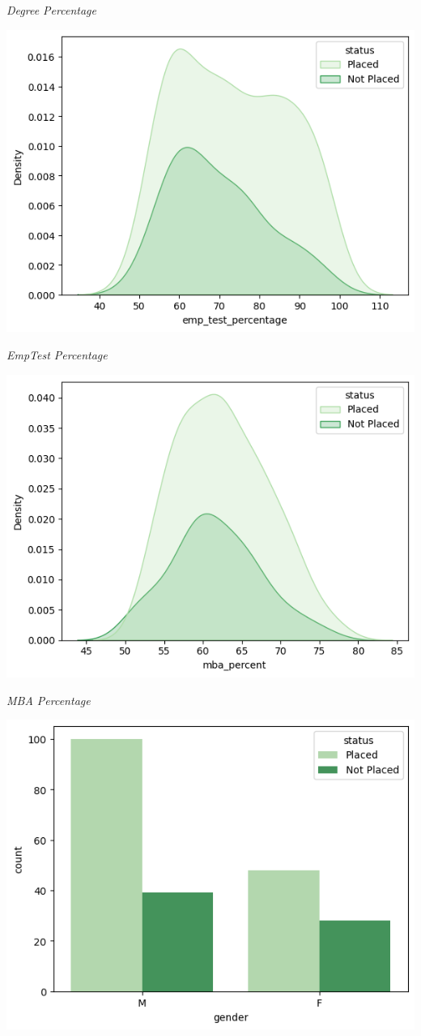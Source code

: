 \documentclass{article}
\begin{document}
\begin{center}
    \textit{Degree Percentage}

    \includegraphics[scale=0.5]{emptestpercentage.png}

    \textit{EmpTest Percentage}

    \includegraphics[scale=0.5]{mbapercentage.png}

    \textit{MBA Percentage}

    \includegraphics[scale=0.5]{gender.png}


\end{center}
\end{document}
